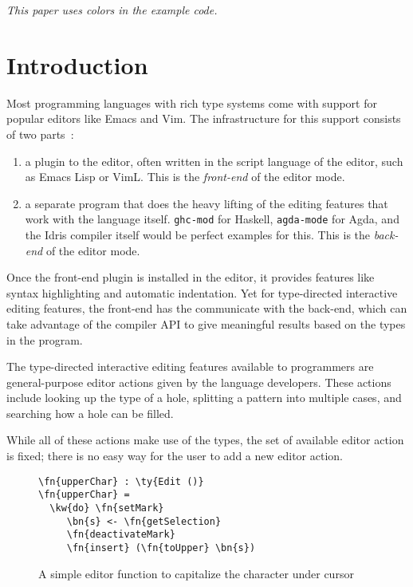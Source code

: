 \documentclass[sigplan, authordraft]{acmart}
\newcommand\fakeslant[1]{%
  \special{pdf: literal 1 0 0.167 1 0 0 cm}#1\special{pdf: literal 1 0 -0.167 1 0 0 cm}}
\newcommand{\IdrisType}[1]{\textcolor{IdrisBlue}{#1}}
\newcommand{\IdrisBound}[1]{\textcolor{IdrisLilac}{\fakeslant{#1}}}
\newcommand{\IdrisFunction}[1]{\textcolor{IdrisGreen}{#1}}
\newcommand{\IdrisKeyword}[1]{{\textbf{#1}}}
\newcommand{\ty}[1]{\IdrisType{\texttt{#1}}}
\newcommand{\kw}[1]{\IdrisKeyword{\texttt{#1}}}
\newcommand{\fn}[1]{\IdrisFunction{\texttt{#1}}}
\newcommand{\bn}[1]{\IdrisBound{\texttt{#1}}}
\newcommand{\mt}[1]{\mbox{\texttt{#1}}}
\newcommand{\TODO}[1]{{\color{red}{[TODO: #1]}}}
\begin{document}
\maketitle

\emph{This paper uses colors in the example code.}

\section{Introduction}

Most programming languages with rich type systems come with support for popular
editors like Emacs and Vim. The infrastructure for this support consists of
two parts~\cite{editTimeTactics}:

\begin{enumerate}
  \item a plugin to the editor, often written in the script language of the
    editor, such as Emacs Lisp or VimL. This is the \emph{front-end} of the
    editor mode.
  \item a separate program that does the heavy lifting of the editing features
    that work with the language itself.  \mt{ghc-mod} for Haskell,
    \mt{agda-mode} for Agda, and the Idris compiler itself would be perfect
    examples for this. This is the \emph{back-end} of the editor mode.
\end{enumerate}

Once the front-end plugin is installed in the editor, it provides features like
syntax highlighting and automatic indentation. Yet for type-directed
interactive editing features, the front-end has the communicate with the
back-end, which can take advantage of the compiler API to give meaningful
results based on the types in the program.

The type-directed interactive editing features available to programmers are
general-purpose editor actions given by the language developers. These actions
include looking up the type of a hole, splitting a pattern into multiple
cases, and searching how a hole can be filled.

While all of these actions make use of the types, the set of available editor
action is fixed; there is no easy way for the user to add a new editor action.
\TODO{the whole spiel about how my work makes it possible to add a new editor
action in Idris itself}

\begin{figure}[H]
\begin{Verbatim}
\fn{upperChar} : \ty{Edit ()}
\fn{upperChar} =
  \kw{do} \fn{setMark}
     \bn{s} <- \fn{getSelection}
     \fn{deactivateMark}
     \fn{insert} (\fn{toUpper} \bn{s})
\end{Verbatim}
\caption{A simple editor function to capitalize the character under cursor}
\label{fig:upperChar}
\end{figure}
\end{document}
